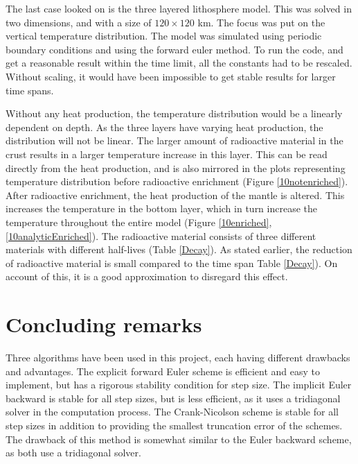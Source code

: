 \documentclass[10pt,a4paper]{article}
\begin{document}
\noindent The last case looked on is the three layered lithosphere model. This was solved in two dimensions, and with a size of $120 \times 120$ km. The focus was put on the vertical temperature distribution. The model was simulated using periodic boundary conditions and using the forward euler method. To run the code, and get a reasonable result within the time limit, all the constants had to be rescaled. Without scaling, it would have been impossible to get stable results for larger time spans.   



\noindent Without any heat production, the temperature distribution would be a linearly dependent on depth. As the three layers have varying heat production, the distribution will not be linear. The larger amount of radioactive material in the crust results in a larger temperature increase in this layer. This can be read directly from the heat production, and is also mirrored in the plots representing temperature distribution before radioactive enrichment (Figure \ref{10notenriched}).\\ 


\noindent After radioactive enrichment, the heat production of the mantle is altered. This increases the temperature in the bottom layer, which in turn increase the temperature throughout the entire model (Figure \ref{10enriched},\ref{10analyticEnriched}). The radioactive material consists of three different materials with different half-lives (Table \ref{Decay}). As stated earlier, the reduction of radioactive material is small compared to the time span Table \ref{Decay}). On account of this, it is a good approximation to disregard this effect.  




\section*{Concluding remarks}
Three algorithms have been used in this project, each having different drawbacks and advantages. The explicit forward Euler scheme is efficient and easy to implement, but has a rigorous stability condition for step size. The implicit Euler backward is stable for all step sizes, but is less efficient, as it uses a tridiagonal solver in the computation process. The Crank-Nicolson scheme is stable for all step sizes in addition to providing the smallest truncation error of the schemes. The drawback of this method is somewhat similar to the Euler backward scheme, as both use a tridiagonal solver.\\ 
\end{document}
